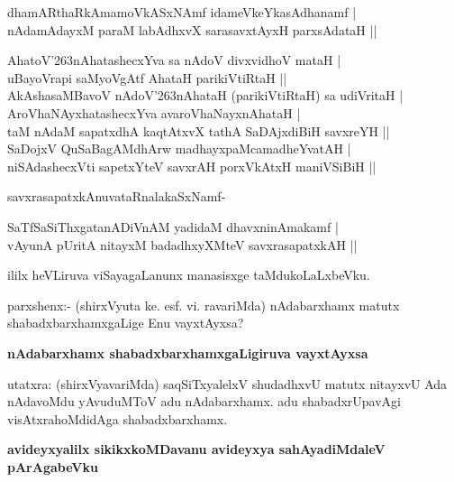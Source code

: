 \begin{shloka}
dhamARthaRkAmamoVkASxNAmf idameVkeYkasAdhanamf |\\\label{159}
nAdamAdayxM paraM labAdhxvX sarasavxtAyxH parxsAdataH ||
\end{shloka}

\begin{shloka}
AhatoV\char'263nAhatashecxYva sa nAdoV divxvidhoV mataH |\\\label{159}
uBayoVrapi saMyoVgAtf AhataH parikiVtiRtaH ||\\
AkAshasaMBavoV nAdoV\char'263nAhataH (parikiVtiRtaH) sa udiVritaH |\\
AroVhaNAyxhatashecxYva avaroVhaNayxnAhataH |\\
taM nAdaM sapatxdhA kaqtAtxvX tathA SaDAjxdiBiH savxreYH ||\\
SaDojxV QuSaBagAMdhArw madhayxpaMcamadheYvatAH |\\
niSAdashecxVti sapetxYteV savxrAH porxVkAtxH maniVSiBiH ||
\end{shloka}

\noindent
savxrasapatxkAnuvataRnalakaSxNamf-\label{160}

\begin{shloka}
SaTfSaSiThxgatanADiVnAM yadidaM dhavxninAmakamf |\\
vAyunA pUritA nitayxM badadhxyXMteV savxrasapatxkAH ||
\end{shloka}

\noindent
ililx heVLiruva viSayagaLanunx manasisxge taMdukoLaLxbeVku.

parxshenx:- (shirxVyuta ke. esf. vi. ravariMda) nAdabarxhamx matutx shabadxbarxhamxgaLige Enu vayxtAyxsa?

{\bigskip
\noindent
{\large\bf nAdabarxhamx shabadxbarxhamxgaLigiruva vayxtAyxsa}}\label{160}
\medskip

\noindent
utatxra: (shirxVyavariMda) saqSiTxyalelxV shudadhxvU matutx nitayxvU Ada nAdavoMdu yAvuduMToV adu nAdabarxhamx. adu shabadxrUpavAgi visAtxrahoMdidAga shabadxbarxhamx.

{\bigskip
\noindent
{\large\bf avideyxyalilx sikikxkoMDavanu avideyxya sahAyadiMdaleV pArAgabeVku}}\label{page160}
\medskip

